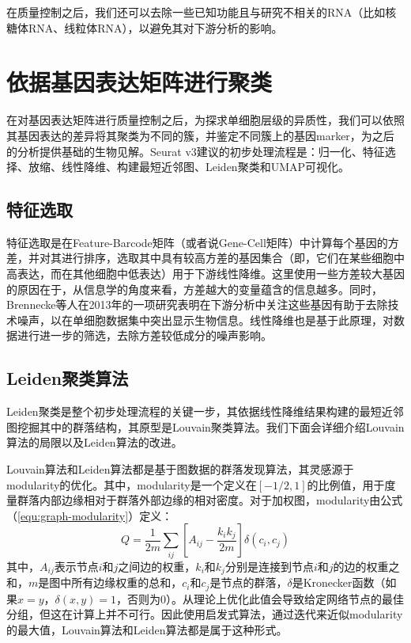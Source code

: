   在质量控制之后，我们还可以去除一些已知功能且与研究不相关的RNA（比如核糖体RNA、线粒体RNA），以避免其对下游分析的影响。

\section{依据基因表达矩阵进行聚类}
  在对基因表达矩阵进行质量控制之后，为探求单细胞层级的异质性，我们可以依照其基因表达的差异将其聚类为不同的簇，并鉴定不同簇上的基因marker，为之后的分析提供基础的生物见解。Seurat v3\cite{butler2018integrating,stuart2019comprehensive}建议的初步处理流程是：归一化、特征选择、放缩、线性降维、构建最短近邻图、Leiden聚类和UMAP可视化。
\subsection{特征选取}
  特征选取是在Feature-Barcode矩阵（或者说Gene-Cell矩阵）中计算每个基因的方差，并对其进行排序，选取其中具有较高方差的基因集合（即，它们在某些细胞中高表达，而在其他细胞中低表达）用于下游线性降维。这里使用一些方差较大基因的原因在于，从信息学的角度来看，方差越大的变量蕴含的信息越多。同时，Brennecke等人在2013年的一项研究\cite{brennecke2013accounting}表明在下游分析中关注这些基因有助于去除技术噪声，以在单细胞数据集中突出显示生物信息。线性降维也是基于此原理，对数据进行进一步的筛选，去除方差较低成分的噪声影响。
\subsection{Leiden聚类算法}
  Leiden聚类\cite{traag2019louvain}是整个初步处理流程的关键一步，其依据线性降维结果构建的最短近邻图挖掘其中的群落结构，其原型是Louvain聚类算法\cite{blondel2008fast}。我们下面会详细介绍Louvain算法的局限以及Leiden算法的改进。

  Louvain算法和Leiden算法都是基于图数据的群落发现算法，其灵感源于modularity的优化。其中，modularity是一个定义在$[-1/2,1]$的比例值，用于度量群落内部边缘相对于群落外部边缘的相对密度。对于加权图，modularity由公式（\ref{equ:graph-modularity}）定义：
\begin{equation}
  \label{equ:graph-modularity}
  Q = \frac{1}{2m}\sum_{ij}\left[A_{ij} - \frac{k_{i}k_{j}}{2m}\right]\delta(c_{i},c_{j})
\end{equation}
其中，$A_{ij}$表示节点$i$和$j$之间边的权重，$k_{i}$和$k_{j}$分别是连接到节点$i$和$j$的边的权重之和，$m$是图中所有边缘权重的总和，$c_{i}$和$c_{j}$是节点的群落，$\delta$是Kronecker函数（如果$x=y$，$\delta(x,y)=1$，否则为0）。从理论上优化此值会导致给定网络节点的最佳分组，但这在计算上并不可行。因此使用启发式算法，通过迭代来近似modularity的最大值，Louvain算法和Leiden算法都是属于这种形式。

